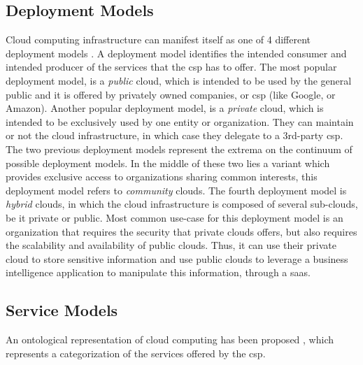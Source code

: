 \documentclass[12pt, titlepage]{uo_temp}
\begin{document}
     

     \subsection{Deployment Models}
     Cloud computing infrastructure can manifest itself as one of 4 different
     deployment models \cite{nist}.
     A deployment model identifies the intended consumer and intended producer of the
     services that the \gls{csp} has to offer.
     The most popular deployment model, is a \emph{public} cloud, which is intended to be used by
     the general public and it is offered by privately owned companies, or \gls{csp} (like Google, or
     Amazon). 
     Another popular deployment model, is a \emph{private} cloud, which is intended to be
     exclusively used by one entity or organization. They can maintain or not the cloud 
     infrastructure, in which case they delegate to a 3rd-party \gls{csp}.
     The two previous deployment models represent the extrema on the continuum of possible
     deployment models. In the middle of these two lies a variant which provides exclusive
     access to organizations sharing common interests, this deployment model refers to
     \emph{community} clouds. 
     The fourth deployment model is \emph{hybrid} clouds, in which the cloud
     infrastructure is composed of several sub-clouds, be it private or public. Most
     common use-case for this deployment model is an organization that requires the
     security that private clouds offers, but also requires the scalability and
     availability of public clouds. Thus, it can use their private cloud to store
     sensitive information and use public clouds to leverage a business intelligence
     application to manipulate this information, through a \gls{saas}.
     
     \subsection{Service Models}
     An ontological representation of cloud computing has been proposed \cite{ontology},
     which represents a categorization of the services offered by the \gls{csp}.
\end{document}
